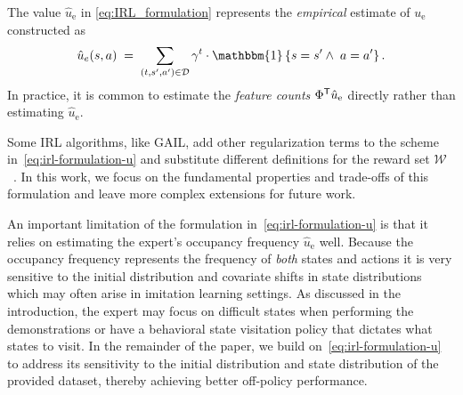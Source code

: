 \documentclass[10pt]{article}
\renewcommand{\cite}{\citep}
\theoremstyle{plain}
\theoremstyle{remark}
\begin{document}
The value $\hat{u}_{\mathrm{e}}$ in \eqref{eq:IRL_formulation} represents the \emph{empirical} estimate of $u_{\mathrm{e}}$ constructed as
\begin{equation} \label{eq:definition_u_hat}
  \hat{u}_e(s,a)
  \;=\; \sum_{(t, s',a') \in \mathcal{D}} \gamma^t \cdot  \mathbbm{1}\left\{s=s' \wedge\; a=a'\right\}.
\end{equation}
In practice, it is common to estimate the \emph{feature counts} $\Phi^{\mathsf{T}} \hat{u}_{\mathrm{e}}$ directly rather than estimating $\hat{u}_{\mathrm{e}}$.

Some IRL algorithms, like GAIL, add other regularization terms to the scheme in~\eqref{eq:irl-formulation-u} and substitute different definitions for the reward set $\mathcal{W}$~\cite{Ho2016}. In this work, we focus on the fundamental properties and trade-offs of this formulation and leave more complex extensions for future work.

An important limitation of the formulation in~\eqref{eq:irl-formulation-u} is that it relies on estimating the expert's occupancy frequency $\hat{u}_{\mathrm{e}}$ well. Because the occupancy frequency represents the frequency of \emph{both} states and actions it is very sensitive to the initial distribution and covariate shifts in state distributions which may often arise in imitation learning settings. As discussed in the introduction, the expert may focus on difficult states when performing the demonstrations or have a behavioral state visitation policy that dictates what states to visit. In the remainder of the paper, we build on~\eqref{eq:irl-formulation-u} to address its sensitivity to the initial distribution and state distribution of the provided dataset, thereby achieving better off-policy performance. 



\end{document}
